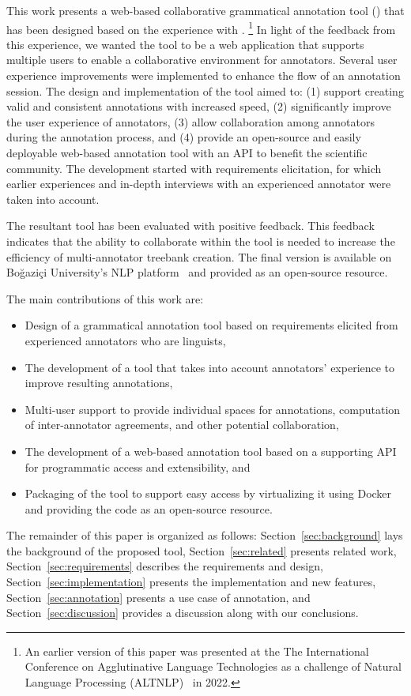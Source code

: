 This work presents a web-based collaborative grammatical annotation tool (\boatvtwo) that has been designed based on the experience with \boatvone.
\footnote{An earlier version of this paper was presented at the The International Conference on Agglutinative Language Technologies as a challenge of Natural Language Processing (ALTNLP)~\cite{ALTNLP} in 2022.}
In light of the feedback from this experience, we wanted the tool to be a web application that supports multiple users to enable a collaborative environment for annotators.
Several user experience improvements were implemented to enhance the flow of an annotation session.
The design and implementation of the tool aimed to: (1) support creating valid and consistent annotations with increased speed, (2) significantly improve the user experience of annotators, (3) allow collaboration among annotators during the annotation process, and (4) provide an open-source and easily deployable web-based annotation tool with an API to benefit the scientific community.
The development started with requirements elicitation, for which earlier experiences and in-depth interviews with an experienced annotator were taken into account.

The resultant tool has been evaluated with positive feedback.
This feedback indicates that the ability to collaborate within the tool is needed to increase the efficiency of multi-annotator treebank creation.
The final version is available on Boğaziçi University's NLP platform~\cite{TULAP} and provided as an open-source resource.

The main contributions of this work are:
\begin{itemize}
\setlength\itemsep{0em}
        \item Design of a grammatical annotation tool based on requirements elicited from experienced annotators who are linguists,
        \item The development of a tool that takes into account annotators' experience to improve resulting annotations,
        \item Multi-user support to provide individual spaces for annotations, computation of inter-annotator agreements, and other potential collaboration,
        \item The development of a web-based annotation tool based on a supporting API for programmatic access and extensibility, and
        \item Packaging of the tool to support easy access by virtualizing it using Docker~\cite{docker} and providing the code as an open-source resource.
\end{itemize}

The remainder of this paper is organized as follows:
Section~\ref{sec:background} lays the background of the proposed tool,
Section~\ref{sec:related} presents related work,
Section~\ref{sec:requirements} describes the requirements and design,
Section~\ref{sec:implementation} presents the implementation and new features,
Section~\ref{sec:annotation} presents a use case of annotation, and
Section~\ref{sec:discussion} provides a discussion along with our conclusions.

